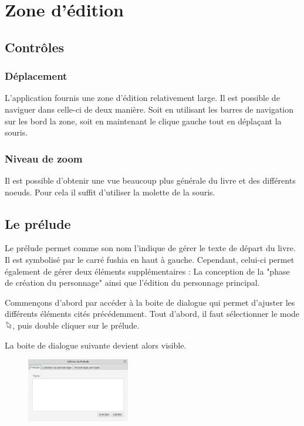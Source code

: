 \chapter{Zone d'édition}

	\section{Contrôles}

		\subsection{Déplacement}

			L'application fournis une zone d'édition relativement large. Il est possible de naviguer dans celle-ci de deux manière. Soit en utilisant les barres de navigation sur les bord la zone, soit en maintenant le clique gauche tout en déplaçant la souris.

		\subsection{Niveau de zoom}

			Il est possible d'obtenir une vue beaucoup plus générale du livre et des différents noeuds. Pour cela il suffit d'utiliser la molette de la souris.

	\section{Le prélude}

        Le prélude permet comme son nom l'indique de gérer le texte de départ du livre. Il est symbolisé par le carré fushia en haut à gauche. Cependant, celui-ci permet également de gérer deux éléments supplémentaires : La conception de la "phase de création du personnage" ainsi que l'édition du personnage principal.

		Commençons d'abord par accéder à la boite de dialogue qui permet d'ajuster les différents éléments cités précédemment. Tout d'abord, il faut sélectionner le mode \includegraphics[height=10pt]{img/icons/select.png}, puis double cliquer sur le prélude.

		La boite de dialogue suivante devient alors visible.

		\begin{figure}[H]
			\centering\includegraphics[width=0.4\textwidth, keepaspectratio]{img/prelude.png}
		\end{figure}

